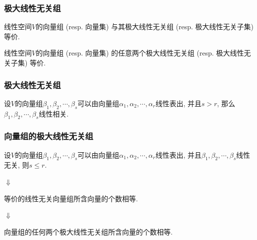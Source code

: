 \documentclass[CJK]{beamer}
\begin{document}
\begin{frame}
	\frametitle{极大线性无关组} \pause
	\begin{theorem}
		线性空间$V$的向量组 (resp. 向量集) 与其极大线性无关组 (resp. 极大线性无关子集) 等价. \pause
	\end{theorem}

\begin{theorem}
	线性空间$V$的向量组 (resp. 向量集) 的任意两个极大线性无关组 (resp. 极大线性无关子集) 等价.
\end{theorem}
\end{frame}
	
	\begin{frame}
		\frametitle{极大线性无关组} \pause
		\begin{lemma}
			设$V$的向量组$\beta_{1}, \beta_{2}, \cdots, \beta_{s}$可以由向量组$\alpha_{1}, \alpha_{2}, \cdots, \alpha_{r}$线性表出, 并且$s>r$, 那么$\beta_{1}, \beta_{2}, \cdots, \beta_{s}$线性相关.
		\end{lemma}
		
		
	\end{frame}

\begin{frame}
	\frametitle{向量组的极大线性无关组} \pause
	\begin{corollary}
		设$V$的向量组$\beta_{1}, \beta_{2}, \cdots, \beta_{s}$可以由向量组$\alpha_{1}, \alpha_{2}, \cdots, \alpha_{r}$线性表出, 并且$\beta_{1}, \beta_{2}, \cdots, \beta_{s}$线性无关, 则$s\leqslant r$.
	\end{corollary} \pause

\begin{center}
	$\Downarrow$
\end{center}
	
	\begin{corollary}
		等价的线性无关向量组所含向量的个数相等.\pause
	\end{corollary}

\begin{center}
	$\Downarrow$
\end{center}

\begin{corollary}
	向量组的任何两个极大线性无关组所含向量的个数相等.
\end{corollary}


\end{frame}
\end{document}

